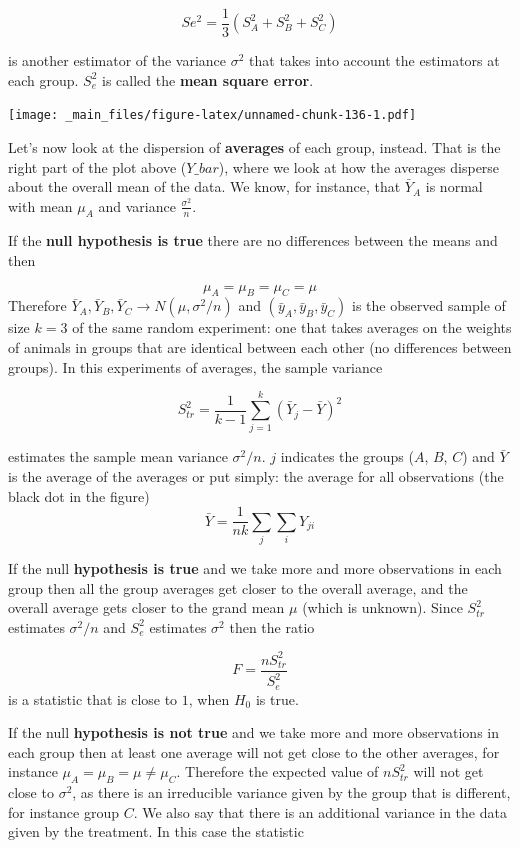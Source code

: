 \documentclass[
]{book}
\begin{document}
\[Se^2 = \frac{1}{3}(S_A^2+S_B^2+S_C^2)\]

is another estimator of the variance \(\sigma^2\) that takes into account the estimators at each group. \(S_e^2\) is called the \textbf{mean square error}.

\texttt{[image: \_main\_files/figure-latex/unnamed-chunk-136-1.pdf]}

Let's now look at the dispersion of \textbf{averages} of each group, instead. That is the right part of the plot above (\(Y\_bar\)), where we look at how the averages disperse about the overall mean of the data. We know, for instance, that \(\bar{Y}_A\) is normal with mean \(\mu_A\) and variance \(\frac{\sigma^2}{n}\).

If the \textbf{null hypothesis is true} there are no differences between the means and then

\[\mu_A=\mu_B=\mu_C=\mu\]
Therefore \(\bar{Y}_A, \bar{Y}_B, \bar{Y}_C \rightarrow N(\mu, \sigma^2/n)\) and \((\bar{y}_A, \bar{y}_B, \bar{y}_C )\) is the observed sample of size \(k=3\) of the same random experiment: one that takes averages on the weights of animals in groups that are identical between each other (no differences between groups). In this experiments of averages, the sample variance

\[S^2_{tr}=\frac{1}{k-1} \sum_{j=1}^k(\bar{Y}_{j}-\bar{Y})^2\]

estimates the sample mean variance \(\sigma^2/n\). \(j\) indicates the groups (\(A\), \(B\), \(C\)) and \(\bar{Y}\) is the average of the averages or put simply: the average for all observations (the black dot in the figure) \[\bar{Y}=\frac{1}{nk}\sum_j \sum_i Y_{ji}\]

If the null \textbf{hypothesis is true} and we take more and more observations in each group then all the group averages get closer to the overall average, and the overall average gets closer to the grand mean \(\mu\) (which is unknown). Since \(S_{tr}^2\) estimates \(\sigma^2/n\) and \(S_e^2\) estimates \(\sigma^2\) then the ratio

\[F=\frac{n S_{tr}^2}{S_e^2}\]
is a statistic that is close to \(1\), when \(H_0\) is true.

If the null \textbf{hypothesis is not true} and we take more and more observations in each group then at least one average will not get close to the other averages, for instance \(\mu_A=\mu_B=\mu \neq \mu_C\). Therefore the expected value of \(nS^2_{tr}\) will not get close to \(\sigma^2\), as there is an irreducible variance given by the group that is different, for instance group \(C\). We also say that there is an additional variance in the data given by the treatment. In this case the statistic
\end{document}
